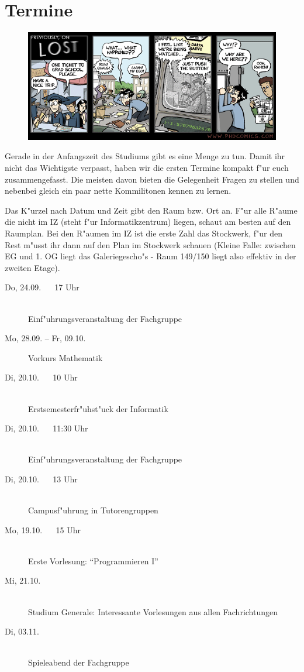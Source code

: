 \section{Termine}

\begin{figure}[b]
  \includegraphics[width=\textwidth ]{bilder/comics/phd092706s.png}
\end{figure}

Gerade in der Anfangszeit des Studiums gibt es eine Menge zu tun. Damit ihr
nicht das Wichtigste verpasst, haben wir die ersten Termine kompakt f"ur
euch zusammengefasst. Die meisten davon bieten die Gelegenheit Fragen zu
stellen und nebenbei gleich ein paar nette Kommilitonen kennen zu lernen.

Das K"urzel nach Datum und Zeit gibt den Raum bzw. Ort an. F"ur alle R"aume die nicht
im IZ (steht f"ur Informatikzentrum) liegen, schaut am besten auf den
Raumplan. Bei den R"aumen im IZ ist die erste Zahl das Stockwerk, f"ur
den Rest m"usst ihr dann auf den Plan im Stockwerk schauen (Kleine Falle:
zwischen EG und 1. OG liegt das Galeriegescho"s - Raum 149/150 liegt also
effektiv in der zweiten Etage).\par
\newpage
\begin{description}
  \item[Do, 24.09. ~~ 17 Uhr] \hfill {}\\
    Einf"uhrungsveranstaltung der Fachgruppe
  \item[Mo, 28.09. -- Fr, 09.10.]
    Vorkurs Mathematik
  \item[Di, 20.10. ~~ 10 Uhr] \hfill {} \\
    Erstsemesterfr"uhst"uck der Informatik
  \item[Di, 20.10. ~~ 11:30 Uhr] \hfill {} \\
    Einf"uhrungsveranstaltung der Fachgruppe
  \item[Di, 20.10. ~~ 13 Uhr] \hfill {} \\
    Campusf"uhrung in Tutorengruppen
  \item[Mo, 19.10. ~~ 15 Uhr] \hfill {}\\
    Erste Vorlesung: "`Programmieren I"'
  \item[Mi, 21.10.] \hfill {}\\
    Studium Generale: Interessante Vorlesungen aus allen Fachrichtungen
  \item[Di, 03.11.] \hfill {}\\
    Spieleabend der Fachgruppe
\end{description}



